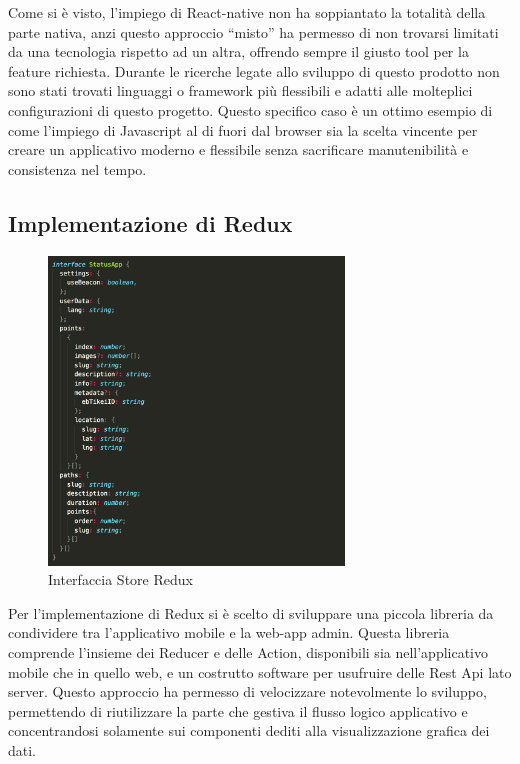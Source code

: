 Come si è visto, l’impiego di React-native non ha soppiantato la totalità della parte nativa, anzi questo approccio “misto” ha permesso di non trovarsi limitati da una tecnologia rispetto ad un altra, offrendo sempre il giusto tool per la feature richiesta. Durante le ricerche legate allo sviluppo di questo prodotto non sono stati trovati linguaggi o framework più flessibili e adatti alle molteplici configurazioni di questo progetto. Questo specifico caso è un ottimo esempio di come l’impiego di Javascript al di fuori dal browser sia la scelta vincente per creare un applicativo moderno e flessibile senza sacrificare manutenibilità e consistenza nel tempo.

\subsection{Implementazione di Redux}\vspace{5mm}

\begin{figure}[h]
\centering
\includegraphics[width=0.7\textwidth]{images/store.png}
\caption{Interfaccia Store Redux}
\end{figure}

Per l'implementazione di Redux si è scelto di sviluppare una piccola libreria da condividere tra l'applicativo mobile e la web-app admin. Questa libreria comprende l'insieme dei Reducer e delle Action, disponibili sia nell'applicativo mobile che in quello web, e un costrutto software per usufruire delle Rest Api lato server. Questo approccio ha permesso di velocizzare notevolmente lo sviluppo, permettendo di riutilizzare la parte che gestiva il flusso logico applicativo e concentrandosi solamente sui componenti dediti alla visualizzazione grafica dei dati.\vspace{5mm}

